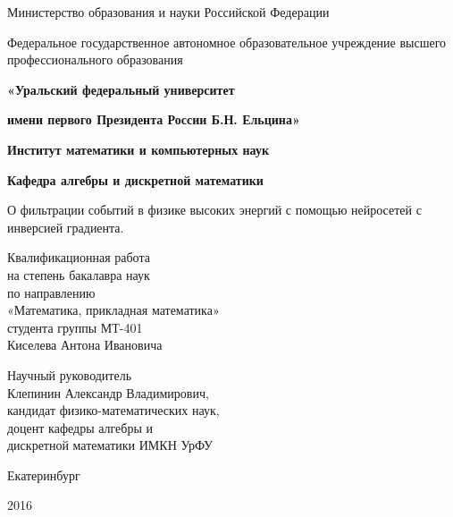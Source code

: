 \documentclass[14pt]{extarticle}
\begin{document}
\thispagestyle{empty}

\begin{center}

\scriptsize{
Министерство образования и науки Российской Федерации

Федеральное государственное автономное образовательное учреждение высшего профессионального образования
}

\textbf{«Уральский федеральный университет}

\textbf{имени первого Президента России Б.Н. Ельцина»}

\textbf{\large Институт математики и компьютерных наук}

\textbf{\large Кафедра алгебры и дискретной математики}


\vfill
\vfill

\Large  О фильтрации событий в физике высоких энергий с помощью нейросетей с инверсией градиента.

\end{center}

\vfill

\hspace*{0.4\textwidth}
\parbox{0.6\textwidth}{
\noindent
Квалификационная работа\\
на степень бакалавра наук\\
по направлению\\
«Математика, прикладная математика»\\
студента группы МТ-401\\
Киселева Антона Ивановича

\bigskip

\noindent
Научный руководитель\\
Клепинин Александр Владимирович,\\
кандидат физико-математических наук,\\
доцент кафедры алгебры и\\
дискретной математики ИМКН УрФУ
}

\vfill
\vfill

\begin{center}
Екатеринбург

2016
\end{center}


\sloppy
\end{document}
